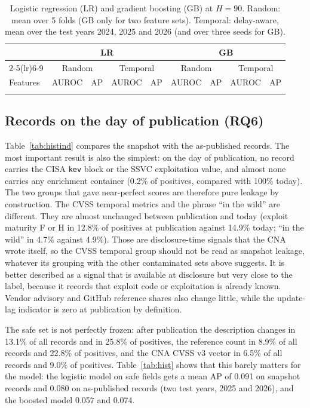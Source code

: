 \documentclass[conference,a4paper]{IEEEtran}
\begin{document}
\begin{table}[t]
\centering
\caption{Logistic regression (LR) and gradient boosting (GB) at $H=90$. Random: mean over 5 folds (GB only for two feature sets). Temporal: delay-aware, mean over the test years 2024, 2025 and 2026 (and over three seeds for GB).}
\label{tab:gbm}
\small
\begin{tabular}{lcccccccc}
\toprule
 & \multicolumn{4}{c}{LR} & \multicolumn{4}{c}{GB}\\
\cmidrule(lr){2-5}\cmidrule(lr){6-9}
 & \multicolumn{2}{c}{Random} & \multicolumn{2}{c}{Temporal} & \multicolumn{2}{c}{Random} & \multicolumn{2}{c}{Temporal}\\
Features & AUROC & AP & AUROC & AP & AUROC & AP & AUROC & AP \\
\midrule
\\
\bottomrule
\end{tabular}
\end{table}

\subsection{Records on the day of publication (RQ6)}

Table~\ref{tab:histind} compares the snapshot with the as-published records. The most important result is also the simplest: on the day of publication, no record carries the CISA \texttt{kev} block or the SSVC exploitation value, and almost none carries any enrichment container (0.2\% of positives, compared with 100\% today). The two groups that gave near-perfect scores are therefore pure leakage by construction. The CVSS temporal metrics and the phrase ``in the wild'' are different. They are almost unchanged between publication and today (exploit maturity F or H in 12.8\% of positives at publication against 14.9\% today; ``in the wild'' in 4.7\% against 4.9\%). Those are disclosure-time signals that the CNA wrote itself, so the CVSS temporal group should not be read as snapshot leakage, whatever its grouping with the other contaminated sets above suggests. It is better described as a signal that is available at disclosure but very close to the label, because it records that exploit code or exploitation is already known. Vendor advisory and GitHub reference shares also change little, while the update-lag indicator is zero at publication by definition.

The safe set is not perfectly frozen: after publication the description changes in 13.1\% of all records and in 25.8\% of positives, the reference count in 8.9\% of all records and 22.8\% of positives, and the CNA CVSS v3 vector in 6.5\% of all records and 9.0\% of positives. Table~\ref{tab:hist} shows that this barely matters for the model: the logistic model on safe fields gets a mean AP of 0.091 on snapshot records and 0.080 on as-published records (two test years, 2025 and 2026), and the boosted model 0.057 and 0.074.
\end{document}
